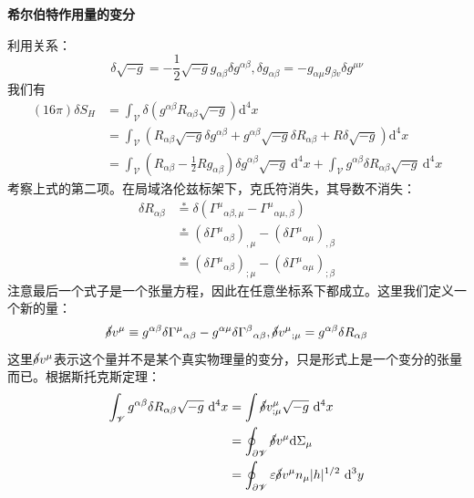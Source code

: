 \documentclass[hyperref, UTF8, a4paper]{ctexart}
\begin{document}
\textbf{希尔伯特作用量的变分}

利用关系：
\begin{equation*}
	\delta \sqrt{-g} =-\frac{1}{2}\sqrt{-g} g_{\alpha \beta } \delta g^{\alpha \beta } ,\delta g_{\alpha \beta } =-g_{\alpha \mu } g_{\beta v} \delta g^{\mu \nu }
\end{equation*}
我们有
\begin{equation*}
	\begin{aligned}
		(16\pi )\delta S_{H} & =\int _{\mathscr{V}} \delta \left( g^{\alpha \beta } R_{\alpha \beta }\sqrt{-g}\right)\mathrm{d}^{4} x\\
		& =\int _{\mathscr{V}}\left( R_{\alpha \beta }\sqrt{-g} \delta g^{\alpha \beta } +g^{\alpha \beta }\sqrt{-g} \delta R_{\alpha \beta } +R\delta \sqrt{-g}\right)\mathrm{d}^{4} x\\
		& =\int _{\mathscr{V}}\left( R_{\alpha \beta } -\frac{1}{2} Rg_{\alpha \beta }\right) \delta g^{\alpha \beta }\sqrt{-g} \ \mathrm{d}^{4} x+\int _{\mathscr{V}} g^{\alpha \beta } \delta R_{\alpha \beta }\sqrt{-g} \ \mathrm{d}^{4} x
	\end{aligned}
\end{equation*}
考察上式的第二项。在局域洛伦兹标架下，克氏符消失，其导数不消失：
\begin{equation*}
	\begin{aligned}
		\delta R_{\alpha \beta } & \stackrel{*}{=} \delta \left( \Gamma ^{\mu }{}_{\alpha \beta ,\mu } -\Gamma ^{\mu }{}_{\alpha \mu ,\beta }\right)\\
		& \stackrel{*}{=}\left( \delta \Gamma ^{\mu }{}_{\alpha \beta }\right)_{,\mu } -\left( \delta \Gamma ^{\mu }{}_{\alpha \mu }\right)_{,\beta }\\
		& \stackrel{*}{=}\left( \delta \Gamma ^{\mu }{}_{\alpha \beta }\right)_{;\mu } -\left( \delta \Gamma ^{\mu }{}_{\alpha \mu }\right)_{;\beta }
	\end{aligned}
\end{equation*}
注意最后一个式子是一个张量方程，因此在任意坐标系下都成立。这里我们定义一个新的量：
\begin{equation*}
	\cancel{\delta } v^{\mu } \equiv g^{\alpha \beta } \delta \Gamma ^{\mu }{}_{\alpha \beta } -g^{\alpha \mu } \delta \Gamma ^{\beta }{}_{\alpha \beta } ,\cancel{\delta } v^{\mu }{}_{;\mu } =g^{\alpha \beta } \delta R_{\alpha \beta }
\end{equation*}
这里$\cancel{\delta } v^{\mu }$表示这个量并不是某个真实物理量的变分，只是形式上是一个变分的张量而已。根据斯托克斯定理：
\begin{equation*}
	\begin{aligned}
		\int _{\mathscr{V}} g^{\alpha \beta } \delta R_{\alpha \beta }\sqrt{-g} \ \mathrm{d}^{4} x & =\int \cancel{\delta } v_{;\mu }^{\mu }\sqrt{-g} \ \mathrm{d}^{4} x\\
		& =\oint _{\partial \mathscr{V}}\cancel{\delta } v^{\mu }\mathrm{d} \Sigma _{\mu }\\
		& =\oint _{\partial \mathscr{V}} \varepsilon \cancel{\delta } v^{\mu } n_{\mu } |h|^{1/2} \ \mathrm{d}^{3} y
	\end{aligned}
\end{equation*}
\end{document}
